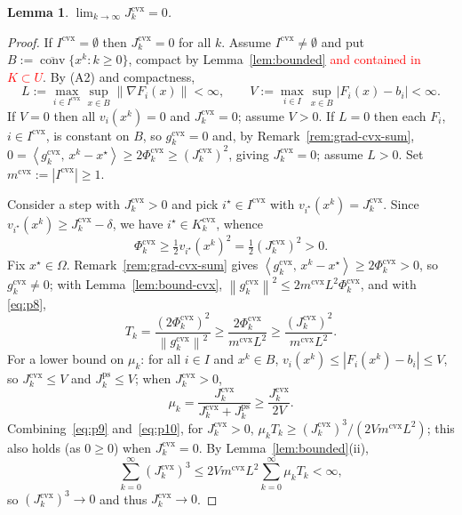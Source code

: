 \documentclass[]{interact}
\theoremstyle{plain}
\newtheorem{lemma}[theorem]{Lemma}
\theoremstyle{definition}
\theoremstyle{remark}
\newcommand{\norm}[1]{\left\lVert #1 \right\rVert}
\newcommand{\abs}[1]{\left\lvert #1 \right\rvert}
\newcommand{\inner}[2]{\left\langle #1,\, #2 \right\rangle}
\DeclareMathOperator{\conv}{conv}
\newcommand{\cvx}{\mathrm{cvx}}
\newcommand{\ps}{\mathrm{ps}}
\begin{document}
\begin{lemma}\label{lem:jcvx0}
$\displaystyle\lim_{k\to\infty}J^{\cvx}_k=0$.
\end{lemma}
\begin{proof}
If $I^{\cvx}=\emptyset$ then $J^{\cvx}_k=0$ for all $k$. Assume $I^{\cvx}\ne\emptyset$ and
put $B:=\overline{\conv}\{x^k:k\ge0\}$, compact by Lemma~\ref{lem:bounded} \leavevmode\textcolor{red}{and contained
in $K\subset U$}. By (A2) and
compactness,
\[
L:=\max_{i\in I^{\cvx}}\sup_{x\in B}\norm{\nabla F_i(x)}<\infty,\qquad
V:=\max_{i\in I}\sup_{x\in B}\abs{F_i(x)-b_i}<\infty.
\]
If $V=0$ then all $v_i(x^k)=0$ and
$J^{\cvx}_k=0$; assume $V>0$. If $L=0$ then each $F_i$, $i\in I^{\cvx}$, is constant on
$B$, so $g^{\cvx}_k=0$ and, by Remark~\ref{rem:grad-cvx-sum},
$0=\inner{g^{\cvx}_k}{x^k-x^\star}\ge 2\Phi^{\cvx}_k\ge(J^{\cvx}_k)^2$, giving
$J^{\cvx}_k=0$; assume $L>0$. Set $m^{\cvx}:=\abs{I^{\cvx}}\ge1$.

Consider a step with $J^{\cvx}_k>0$ and pick $i^\star\in I^{\cvx}$ with
$v_{i^\star}(x^k)=J^{\cvx}_k$. Since $v_{i^\star}(x^k)\ge J^{\cvx}_k-\delta$, we have
$i^\star\in K^{\cvx}_k$, whence
\begin{equation}\label{eq:p8}
\Phi^{\cvx}_k\ge\tfrac12 v_{i^\star}(x^k)^2=\tfrac12(J^{\cvx}_k)^2>0 .
\end{equation}
Fix $x^\star\in\Omega$. Remark~\ref{rem:grad-cvx-sum} gives
$\inner{g^{\cvx}_k}{x^k-x^\star}\ge2\Phi^{\cvx}_k>0$, so $g^{\cvx}_k\ne0$; with
Lemma~\ref{lem:bound-cvx}, $\norm{g^{\cvx}_k}^2\le2m^{\cvx}L^2\Phi^{\cvx}_k$, and with
\eqref{eq:p8},
\begin{equation}\label{eq:p9}
T_k=\frac{(2\Phi^{\cvx}_k)^2}{\norm{g^{\cvx}_k}^2}\ge\frac{2\Phi^{\cvx}_k}{m^{\cvx}L^2}\ge\frac{(J^{\cvx}_k)^2}{m^{\cvx}L^2}.
\end{equation}
For a lower bound on $\mu_k$: for all $i\in I$ and $x^k\in B$,
$v_i(x^k)\le\abs{F_i(x^k)-b_i}\le V$, so $J^{\cvx}_k\le V$ and $J^{\ps}_k\le V$; when
$J^{\cvx}_k>0$,
\begin{equation}\label{eq:p10}
\mu_k=\frac{J^{\cvx}_k}{J^{\cvx}_k+J^{\ps}_k}\ge\frac{J^{\cvx}_k}{2V}.
\end{equation}
Combining~\eqref{eq:p9} and~\eqref{eq:p10}, for $J^{\cvx}_k>0$,
$\mu_k T_k\ge(J^{\cvx}_k)^3/(2Vm^{\cvx}L^2)$; this also holds (as $0\ge0$) when
$J^{\cvx}_k=0$. By Lemma~\ref{lem:bounded}(ii),
\begin{equation}\label{eq:p12}
\sum_{k=0}^\infty(J^{\cvx}_k)^3\le 2Vm^{\cvx}L^2\sum_{k=0}^\infty\mu_k T_k<\infty,
\end{equation}
so $(J^{\cvx}_k)^3\to0$ and thus $J^{\cvx}_k\to0$.
\end{proof}
\end{document}
